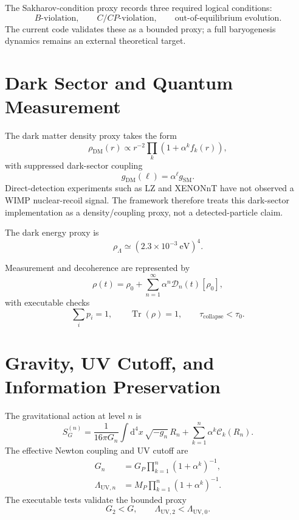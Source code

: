 \documentclass[12pt]{article}
\theoremstyle{remark}
\newcommand{\D}{\mathcal{D}}
\newcommand{\C}{\mathcal{C}}
\newcommand{\dd}{\mathrm{d}}
\newcommand{\Tr}{\operatorname{Tr}}
\begin{document}
The Sakharov-condition proxy records three required logical conditions:
\begin{equation}
  B\text{-violation},\qquad C/CP\text{-violation},\qquad
  \text{out-of-equilibrium evolution}.
\end{equation}
The current code validates these as a bounded proxy; a full baryogenesis
dynamics remains an external theoretical target.

\section{Dark Sector and Quantum Measurement}

The dark matter density proxy takes the form
\begin{equation}
  \rho_{\mathrm{DM}}(r)
  \propto
  r^{-2}\prod_{k}(1+\alpha^k f_k(r)),
\end{equation}
with suppressed dark-sector coupling
\begin{equation}
  g_{\mathrm{DM}}(\ell)=\alpha^{\ell}g_{\mathrm{SM}}.
\end{equation}
Direct-detection experiments such as LZ and XENONnT have not observed a WIMP
nuclear-recoil signal.  The framework therefore treats this dark-sector
implementation as a density/coupling proxy, not a detected-particle claim.

The dark energy proxy is
\begin{equation}
  \rho_{\Lambda}\simeq(2.3\times10^{-3}\ \mathrm{eV})^4.
\end{equation}

Measurement and decoherence are represented by
\begin{equation}
  \rho(t)=\rho_0+\sum_{n=1}^{\infty}\alpha^n\D_n(t)[\rho_0],
\end{equation}
with executable checks
\begin{equation}
  \sum_i p_i=1,\qquad \Tr(\rho)=1,\qquad \tau_{\mathrm{collapse}}<\tau_0.
\end{equation}

\section{Gravity, UV Cutoff, and Information Preservation}

The gravitational action at level $n$ is
\begin{equation}
  S_G^{(n)}
  =
  \frac{1}{16\pi G_n}
  \int \dd^4x\,\sqrt{-g_n}\,R_n
  +\sum_{k=1}^{n}\alpha^k\C_k(R_n).
  \label{eq:gravity}
\end{equation}
The effective Newton coupling and UV cutoff are
\begin{align}
  G_n &=
  G_P\prod_{k=1}^{n}(1+\alpha^k)^{-1},\\
  \Lambda_{\mathrm{UV},n} &=
  M_P\prod_{k=1}^{n}(1+\alpha^k)^{-1}.
\end{align}
The executable tests validate the bounded proxy
\begin{equation}
  G_2<G,\qquad \Lambda_{\mathrm{UV},2}<\Lambda_{\mathrm{UV},0}.
\end{equation}
\end{document}

